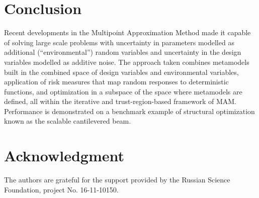 \documentclass{llncs}
\begin{document}
\section{Conclusion}
\label{sec:conclusion}

Recent developments in the Multipoint Approximation Method made it capable of solving large scale problems with uncertainty in parameters modelled as additional (``environmental'') random variables and uncertainty in the design variables modelled as additive noise. The approach taken combines metamodels built in the combined space of design variables and environmental variables, application of risk measures that map random responses to deterministic functions, and optimization in a subspace of the space where metamodels are defined, all within the iterative and trust-region-based framework of MAM. Performance is demonstrated on a benchmark example of structural optimization known as the scalable cantilevered beam.

\section*{Acknowledgment}
The authors are grateful for the support provided by the Russian Science Foundation, project No. 16-11-10150.

{}

\end{document}
